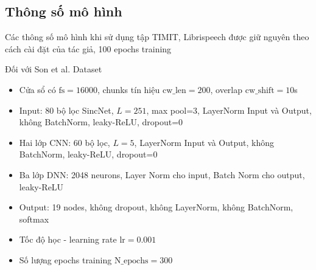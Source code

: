 \documentclass[notheorems, aspectratio=54]{beamer}
\begin{document}
\subsection{Thông số mô hình}
\begin{frame}
	Các thông số mô hình khi sử dụng tập TIMIT, Librispeech được giữ nguyên theo cách cài đặt của tác giả, 100 epochs training
	
	Đối với Son et al. Dataset
	\begin{itemize}
		\item Cửa sổ có $\text{fs} = 16000$, chunks tín hiệu $\text{cw\_len}=200$, overlap $\text{cw\_shift}=10$s
		\item Input: 80 bộ lọc SincNet, $L=251$, max pool=3, LayerNorm Input và Output, không BatchNorm, leaky-ReLU, dropout=0
		\item Hai lớp CNN: 60 bộ lọc, $L=5$, LayerNorm Input và Output, không BatchNorm, leaky-ReLU, dropout=0
		\item Ba lớp DNN: 2048 neurons, Layer Norm cho input, Batch Norm cho output, leaky-ReLU
		\item Output: 19 nodes, không dropout, không LayerNorm, không BatchNorm, softmax
		\item Tốc độ học - learning rate $\text{lr} = 0.001$
		\item Số lượng epochs training $\text{N\_epochs}=300$
	\end{itemize}
\end{frame}
\end{document}
